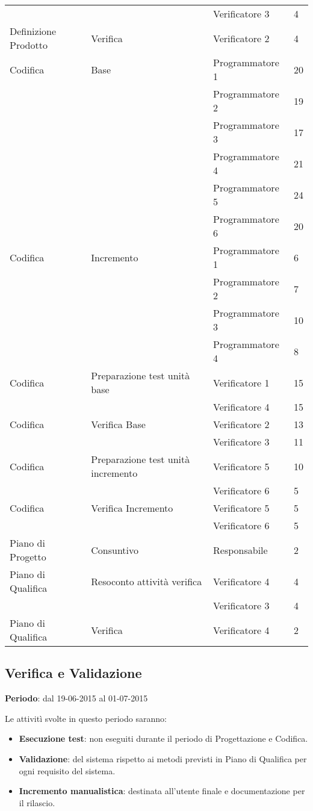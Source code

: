 {{\begin{longtable} [c]{| l | l | l | l |}
		 &	&	Verificatore 3 & 4\\
		 Definizione Prodotto & Verifica & Verificatore 2 & 4 \\
		 Codifica & Base & Programmatore 1 & 20\\
		 &	&	Programmatore 2 & 19\\
		 &	&	Programmatore 3 & 17\\
		 &	&	Programmatore 4 & 21\\
		 &	&	Programmatore 5 & 24\\
		 &	&	Programmatore 6 & 20\\
		 Codifica & Incremento & Programmatore 1 & 6\\
		 &	&	Programmatore 2 & 7\\
		 &	&	Programmatore 3 & 10\\
		 &	&	Programmatore 4 & 8\\
		 Codifica & Preparazione test unit\`{a} base & Verificatore 1 & 15\\
		 &	&	Verificatore 4 & 15\\
		 Codifica & Verifica Base & Verificatore 2 & 13\\
		 &	&	Verificatore 3 & 11\\
		 Codifica & Preparazione test unit\`{a} incremento & Verificatore 5 & 10\\
		 &	&	Verificatore 6 & 5\\
		 Codifica & Verifica Incremento & Verificatore 5 & 5\\
		 &	&	Verificatore 6 & 5\\
		 Piano di Progetto & Consuntivo & Responsabile & 2 \\
		 Piano di Qualifica & Resoconto attivit\`{a} verifica & Verificatore 4 & 4\\
		 &	&	Verificatore 3 & 4\\
		 Piano di Qualifica & Verifica & Verificatore 4 & 2 \\
	\end{longtable}
}
\subsection{Verifica e Validazione}{
	\textbf{Periodo}: dal 19-06-2015 al 01-07-2015
	
	Le attivit\`{i} svolte in questo periodo saranno:
	\begin{itemize}
		\item \textbf{Esecuzione test}: non eseguiti durante il periodo di Progettazione e Codifica.
		\item \textbf{Validazione}: del sistema rispetto ai metodi previsti in Piano di Qualifica per ogni requisito del sistema.
		\item \textbf{Incremento manualistica}: destinata all'utente finale e documentazione per il rilascio.
	\end{itemize}
	
}}
